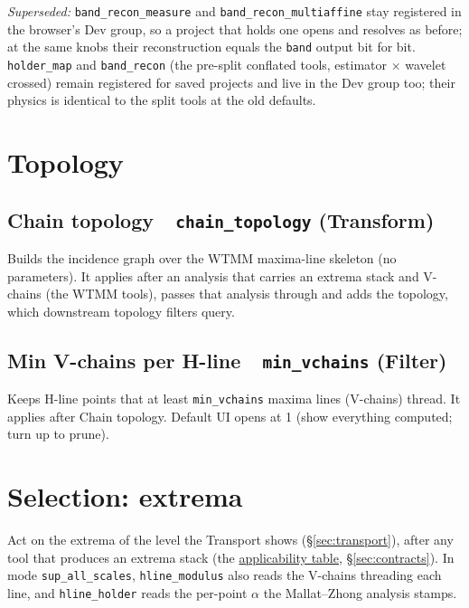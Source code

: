 \documentclass[10pt]{article}
\newcommand{\dev}[1]{\texttt{#1}}
\newcommand{\tool}[2]{#1~\textperiodcentered~\dev{#2}}
\begin{document}
\emph{Superseded:} \dev{band\_recon\_measure} and \dev{band\_recon\_multiaffine} stay
registered in the browser's Dev group, so a project that holds one opens and resolves as
before; at the same knobs their reconstruction equals the \texttt{band} output bit for bit.
\dev{holder\_map} and \dev{band\_recon} (the pre-split conflated tools, estimator $\times$
wavelet crossed) remain registered for saved projects and live in the Dev group too; their
physics is identical to the split tools at the old defaults.

\section{Topology}

\subsection{\tool{Chain topology}{chain\_topology} (Transform)}
Builds the incidence graph over the WTMM maxima-line skeleton (no parameters). It applies after
an analysis that carries an extrema stack and V-chains (the WTMM tools), passes that analysis
through and adds the topology, which downstream topology filters query.

\subsection{\tool{Min V-chains per H-line}{min\_vchains} (Filter)}
Keeps H-line points that at least \texttt{min\_vchains} maxima lines (V-chains) thread. It
applies after Chain topology. Default UI opens at 1 (show everything computed; turn up to
prune).

\section{Selection: extrema}
Act on the extrema of the level the Transport shows (\S\ref{sec:transport}), after any tool
that produces an extrema stack (the \hyperref[tab:applicability]{applicability table},
\S\ref{sec:contracts}). In mode
\texttt{sup\_all\_scales}, \dev{hline\_modulus} also reads the V-chains threading each line,
and \dev{hline\_holder} reads the per-point $\alpha$ the Mallat--Zhong analysis stamps.
\end{document}
